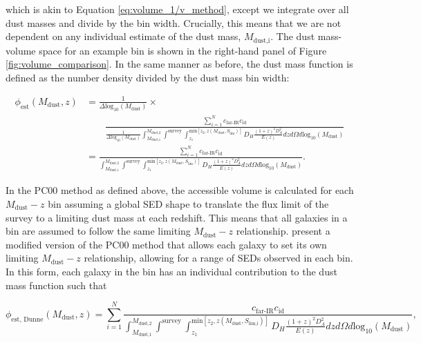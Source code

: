 \noindent which is akin to Equation \ref{eq:volume_1/v_method}, except we integrate over all dust masses and divide by the bin width. Crucially, this means that we are not dependent on any individual estimate of the dust mass, $M_{\textrm{dust,i}}$. The dust mass-volume space for an example bin is shown in the right-hand panel of Figure \ref{fig:volume_comparison}. In the same manner as before, the dust mass function is defined as the number density divided by the dust mass bin width:

\begin{align}
    \phi_{\textrm{est}}(M_{\textrm{dust}},z) &= \frac{1}{\Delta \textrm{log}_{10}(M_{\textrm{dust}})} \times \nonumber \\
    & \qquad \frac{\sum_{i=1}^N c_{\scriptscriptstyle \textrm{far-IR}} c_{\scriptscriptstyle \textrm{id}}}{\frac{1}{\Delta \textrm{log}_{10}(M_\textrm{dust})}\int_{\scriptscriptstyle M_{\textrm{dust,1}}}^{\scriptscriptstyle M_{\textrm{dust,2}}} \int^{\scriptscriptstyle \textrm{survey}} \int_{\scriptscriptstyle z_1}^{\scriptscriptstyle \textrm{min}[z_2, z(M_{\textrm{dust}},S_{\textrm{lim}})]} D_H \frac{(1+z)^2 D_A^2}{E(z)} dz d\Omega d\textrm{log}_{10}(M_\textrm{dust})} \nonumber \\
    &= \frac{\sum_{i=1}^N c_{\scriptscriptstyle \textrm{far-IR}} c_{\scriptscriptstyle \textrm{id}}}{\int_{\scriptscriptstyle M_{\textrm{dust,1}}}^{\scriptscriptstyle M_{\textrm{dust,2}}} \int^{\scriptscriptstyle \textrm{survey}} \int_{\scriptscriptstyle z_1}^{\scriptscriptstyle \textrm{min}[z_2, z(M_{\textrm{dust}},S_{\textrm{lim}})]} D_H \frac{(1+z)^2 D_A^2}{E(z)} dz d\Omega d\textrm{log}_{10}(M_\textrm{dust})}.
\label{eq:phi_pc00_method}
\end{align}

In the PC00 method as defined above, the accessible volume is calculated for each $M_{\textrm{dust}} - z$ bin assuming a global SED shape to translate the flux limit of the survey to a limiting dust mass at each redshift. This means that all galaxies in a bin are assumed to follow the same limiting $M_{\textrm{dust}} - z$ relationship. \citealt{Dunne_2011} present a modified version of the PC00 method that allows each galaxy to set its own limiting $M_{\textrm{dust}} - z$ relationship, allowing for a range of SEDs observed in each bin. In this form, each galaxy in the bin has an individual contribution to the dust mass function such that

\begin{equation}
    \phi_{\textrm{est, Dunne}}(M_{\textrm{dust}},z) = \sum_{i=1}^N \frac{c_{\scriptscriptstyle \textrm{far-IR}} c_{\scriptscriptstyle \textrm{id}}}{\int_{\scriptscriptstyle M_{\textrm{dust,1}}}^{\scriptscriptstyle M_{\textrm{dust,2}}} \int^{\scriptscriptstyle \textrm{survey}} \int_{\scriptscriptstyle z_1}^{\scriptscriptstyle \textrm{min}[z_2, z(M_{\textrm{dust}},S_{\textrm{lim,i}})]} D_H \frac{(1+z)^2 D_A^2}{E(z)} dz d\Omega d\textrm{log}_{10}(M_\textrm{dust})},
\label{eq:phi_pc00_dunne_method}
\end{equation}

